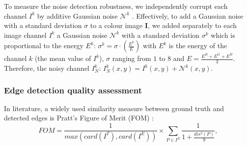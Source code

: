 \documentclass[twoside]{article}
\newcommand\noise{\mathcal{N}} %
\begin{document}
To measure the noise detection robustness, we independently corrupt each channel $I^k$ by additive Gaussian noise $\noise^k$ \cite{zhang_ip_2009}.
Effectively, to add a Gaussian noise with a standard deviation $\sigma$ to a colour image $\textbf{I}$, we added separately to each image channel $I^k$ a Gaussian noise $\noise^k$ with a standard deviation $\sigma^k$ which is proportional to the energy $E^k$: $\sigma^k =\sigma \cdot \left(\frac{E^k}{E}\right)$ with $E^k$ is the energy of the channel $k$ (the mean value of $I^k$), $\sigma$ ranging from $1$ to $8$ and $E=\frac{E^R + E^G + E^B}{3}$. Therefore, the noisy channel $I^k_N$: $I^k_N(x,y)= I^k(x,y) + \noise^k(x,y)$.



%
%







%  
%








\subsubsection{Edge detection quality assessment}
\label{Measuring the edge detection quality}

In literature, a widely used similarity measure between ground truth and detected edges is Pratt's Figure of Merit (FOM) \cite{abdou_pieee_1979}:
\begin{equation}
FOM = \frac{1}{max(card(I^T),card(I^E))} \times \sum_{P\in I^E}\frac{1}{1+\frac{dis^2(P)}{9}} \text{,}
\end{equation}
\end{document}
